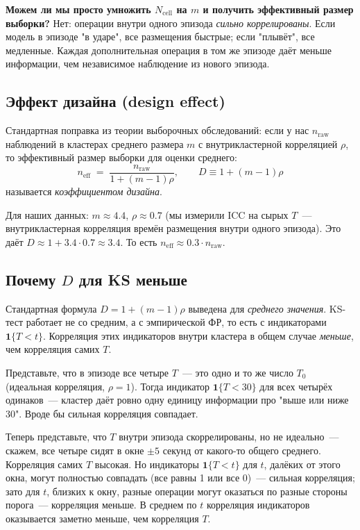 \documentclass[11pt]{article}
\begin{document}
\textbf{Можем ли мы просто умножить $N_\text{cell}$ на $m$ и получить эффективный размер выборки?} Нет: операции внутри одного эпизода \emph{сильно коррелированы}. Если модель в эпизоде "в ударе", все размещения быстрые; если "плывёт", все медленные. Каждая дополнительная операция в том же эпизоде даёт меньше информации, чем независимое наблюдение из нового эпизода.

\subsection{Эффект дизайна (design effect)}

Стандартная поправка из теории выборочных обследований: если у нас $n_\text{raw}$ наблюдений в кластерах среднего размера $m$ с внутрикластерной корреляцией $\rho$, то эффективный размер выборки для оценки среднего:
\[
n_\text{eff} \;=\; \frac{n_\text{raw}}{1 + (m-1)\rho},
\qquad D \equiv 1 + (m-1)\rho
\]
называется \emph{коэффициентом дизайна}.

Для наших данных: $m \approx 4.4$, $\rho \approx 0.7$ (мы измерили ICC на сырых $T$~--- внутрикластерная корреляция времён размещения внутри одного эпизода). Это даёт $D \approx 1 + 3.4 \cdot 0.7 \approx 3.4$. То есть $n_\text{eff} \approx 0.3 \cdot n_\text{raw}$.

\subsection{Почему $D$ для KS меньше}

Стандартная формула $D = 1 + (m-1)\rho$ выведена для \emph{среднего значения}. KS-тест работает не со средним, а с эмпирической ФР, то есть с индикаторами $\mathbf{1}\{T < t\}$. Корреляция этих индикаторов внутри кластера в общем случае \emph{меньше}, чем корреляция самих $T$.

\begin{intuition}
Представьте, что в эпизоде все четыре $T$~--- это одно и то же число $T_0$ (идеальная корреляция, $\rho = 1$). Тогда индикатор $\mathbf{1}\{T < 30\}$ для всех четырёх одинаков~--- кластер даёт ровно одну единицу информации про "выше или ниже 30". Вроде бы сильная корреляция совпадает.

Теперь представьте, что $T$ внутри эпизода скоррелированы, но не идеально~--- скажем, все четыре сидят в окне $\pm 5$ секунд от какого-то общего среднего. Корреляция самих $T$ высокая. Но индикаторы $\mathbf{1}\{T < t\}$ для $t$, далёких от этого окна, могут полностью совпадать (все равны 1 или все 0)~--- сильная корреляция; зато для $t$, близких к окну, разные операции могут оказаться по разные стороны порога~--- корреляция меньше. В среднем по $t$ корреляция индикаторов оказывается заметно меньше, чем корреляция $T$.
\end{intuition}
\end{document}
